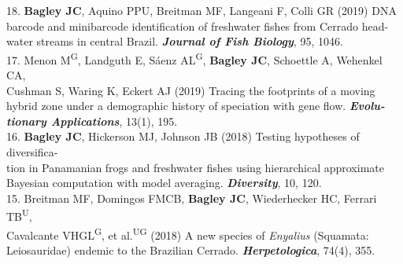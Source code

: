 \documentclass[margin,line]{res}
\begin{document}
\begin{resume}
18. \textbf{Bagley JC}, Aquino PPU, Breitman MF, Langeani F, Colli GR (2019) DNA\\
\hspace*{8mm} barcode and minibarcode identification of freshwater fishes from Cerrado head-\\ \vspace{2mm}
\hspace*{8mm}water streams in central Brazil. \textit{\textbf{Journal of Fish Biology}}, 95, 1046. \\
17. Menon M\textsuperscript{G}, Landguth E, S\'{a}enz AL\textsuperscript{G}, \textbf{Bagley JC}, Schoettle A, Wehenkel CA,\\ 
\hspace*{8mm} Cushman S, Waring K, Eckert AJ (2019) Tracing the footprints of a moving \\
\hspace*{8mm} hybrid zone under a demographic history of speciation with gene flow. \textit{\textbf{Evolu-}\\ \vspace{2mm}
\hspace*{8mm}\textbf{tionary Applications}}, 13(1), 195. \\
16. \textbf{Bagley JC}, Hickerson MJ, Johnson JB (2018) Testing hypotheses of diversifica-\\
\hspace*{8mm} tion in Panamanian frogs and freshwater fishes using hierarchical approximate\\ \vspace{2mm}
\hspace*{8mm}Bayesian computation with model averaging. {\it \textbf{Diversity}}, 10, 120. \\
15. Breitman MF, Domingos FMCB, \textbf{Bagley JC}, Wiederhecker HC, Ferrari TB\textsuperscript{U},\\ 
\hspace*{8mm} Cavalcante VHGL\textsuperscript{G}, et al.\textsuperscript{UG} (2018) A new species of \emph{Enyalius} (Squamata:\\ \vspace{2mm}
\hspace*{8mm}Leiosauridae) endemic to the Brazilian Cerrado. {\it \textbf{Herpetologica}}, 74(4), 355. \\

\end{resume}
\end{document}
